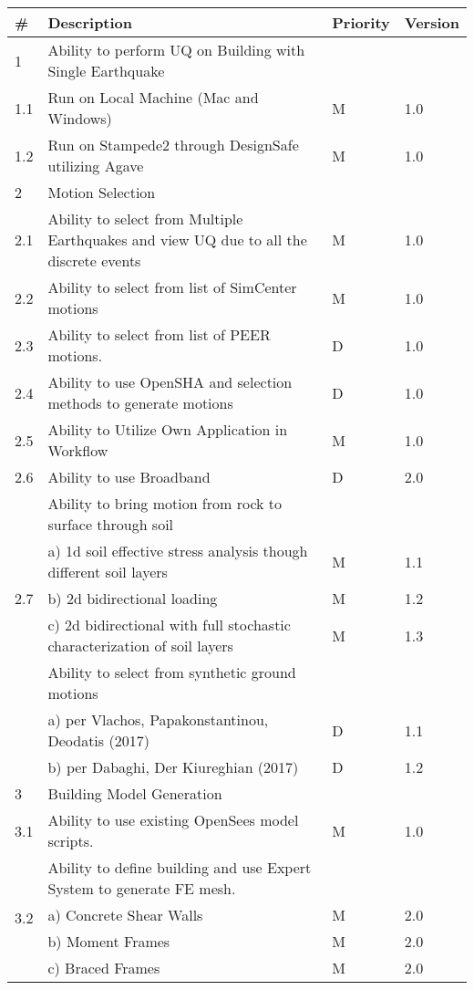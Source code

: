 \begin{table}[hbt!]                 
  \centering
\begin{adjustbox}{max width=\textwidth}            
  \begin{tabular}{llll}                    
    \toprule          
      \# & Description & Priority & Version \\ \hline
    
      1 & Ability to perform UQ on Building with Single Earthquake &  &  \\ \hline
	1.1 & Run on Local Machine (Mac and Windows) & M & 1.0 \\ \hline
	1.2 & Run on Stampede2 through DesignSafe utilizing Agave & M & 1.0 \\ \hline
	2 & Motion Selection &  &  \\ \hline
	2.1 & Ability to select from Multiple Earthquakes and view UQ due to all the discrete events & M & 1.0  \\ \hline
	2.2 & Ability to select from list of SimCenter motions & M & 1.0 \\ \hline
	2.3 & Ability to select from list of PEER motions. & D & 1.0 \\ \hline
	2.4 & Ability to use OpenSHA and selection methods to generate motions & D & 1.0 \\ \hline
	2.5 & Ability to Utilize Own Application in Workflow & M & 1.0 \\ \hline
	2.6 & Ability to use Broadband & D & 2.0 \\ \hline
	\multirow{5}{*}{2.7} 
	& Ability to bring motion from rock to surface through soil &  &  \\ 
	 & a)     1d soil effective stress analysis though different soil layers & M & 1.1  \\ 
	 & b)     2d bidirectional loading & M & 1.2 \\ 
	 & c)     2d bidirectional with full stochastic characterization of soil layers & M & 1.3 \\ \hline

	\multirow{5}{*}{2.8} 
	& Ability to select from synthetic ground motions &  &  \\ 
	 & a)     per Vlachos, Papakonstantinou, Deodatis (2017) & D & 1.1  \\ 
	 & b)     per Dabaghi, Der Kiureghian (2017) & D & 1.2 \\ \hline
	3 & Building Model Generation &  &  \\ \hline
	3.1 & Ability to use existing OpenSees model scripts. & M & 1.0 \\ \hline
	\multirow{5}{*}{3.2}  & Ability to define building and use Expert System to generate FE mesh. &  &  \\
	 & a)     Concrete Shear Walls & M & 2.0 \\ 
	 & b)     Moment Frames & M & 2.0 \\ 
	 & c)     Braced Frames & M & 2.0  \\ \hline
	 

\end{tabular}
\end{adjustbox}
\end{table}
